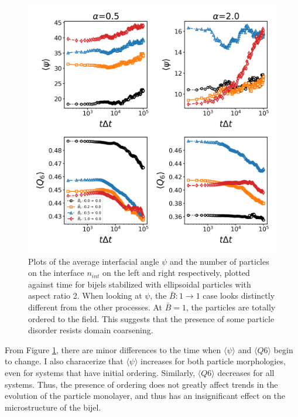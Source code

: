 \begin{figure} 
\centering 
\includegraphics[scale=0.4]{../figures/results/paper2/interface_angle-nint-field_down.png} 
\caption{Plots of the average interfacial angle $\psi$ and the number of particles on the interface $n_{int}$ on the left and right respectively, 
         plotted against time for bijels stabilized with ellipsoidal particles with aspect ratio 2. When looking at $\psi$, the $\bar{B}:1 \rightarrow 1$ 
         case looks distinctly different from the other processes. At $\bar{B} = 1$, the particles are totally ordered to the field. This suggests that 
         the presence of some particle disorder resists domain coarsening.} 
\label{fig:interface_angle-field_down} 
\end{figure}

From Figure \ref{fig:interface_angle-field_down}, there are minor differences to the time when $\langle \psi \rangle$ and $\langle Q6 \rangle$
begin to change. I also characerize that $\langle \psi \rangle$ increases for both particle morphologies, even for systems that have initial ordering.
Similarly, $\langle Q6 \rangle$ decreases for all systems. Thus, the presence of ordering does not greatly affect trends in the evolution of the
particle monolayer, and thus has an insignificant effect on the microstructure of the bijel.


